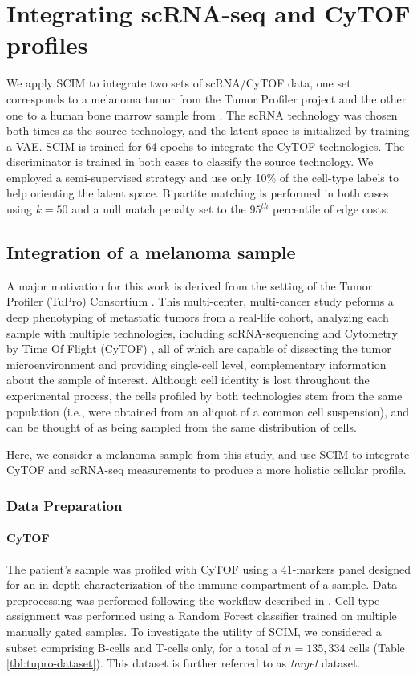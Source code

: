 \section{Integrating scRNA-seq and CyTOF profiles}


We apply SCIM to integrate two sets of scRNA/CyTOF data,
one set corresponds to a melanoma tumor from the Tumor Profiler project \cite{irmisch2020}
and the other one to a human bone marrow sample from \citet{oetjen2018}.
The scRNA technology was chosen both times as the source technology, and the latent space is initialized by training a VAE.
SCIM is trained for 64 epochs to integrate the CyTOF technologies.
The discriminator is trained in both cases to classify the source technology.
We employed a semi-supervised strategy and use only 10\% of the cell-type labels to help orienting the latent space.
Bipartite matching is performed in both cases using $k=50$ and a null match penalty set to the $95^{th}$ percentile of edge costs.


\subsection{Integration of a melanoma sample}
A major motivation for this work is derived from the setting of the Tumor Profiler (TuPro) Consortium \cite{irmisch2020}.
This multi-center, multi-cancer study peforms a deep phenotyping of metastatic tumors from a real-life cohort, 
analyzing each sample with multiple technologies, including scRNA-sequencing \cite{tang2009} and Cytometry by Time Of Flight (CyTOF) \cite{bandura2009},
all of which are capable of dissecting the tumor microenvironment and providing single-cell level, complementary information about the sample of interest.
Although cell identity is lost throughout the experimental process, the cells profiled by both technologies stem from the same population
(i.e., were obtained from an aliquot of a common cell suspension), and can be thought of as being sampled from the same distribution of cells.

Here, we consider a melanoma sample from this study, and use SCIM to integrate CyTOF and scRNA-seq measurements to produce a more holistic cellular profile.

\subsubsection{Data Preparation}
\paragraph{CyTOF}
The patient's sample was profiled with CyTOF using a 41-markers panel designed for an in-depth characterization of the immune compartment of a sample.
Data preprocessing was performed following the workflow described in \cite{chevrier2017, chevrier2018}.
Cell-type assignment was performed using a Random Forest classifier trained on multiple manually gated samples.
To investigate the utility of SCIM, we considered a subset comprising B-cells and T-cells only, for a total of $n{=}135,334$ cells (Table \ref{tbl:tupro-dataset}).
This dataset is further referred to as \textit{target} dataset.

